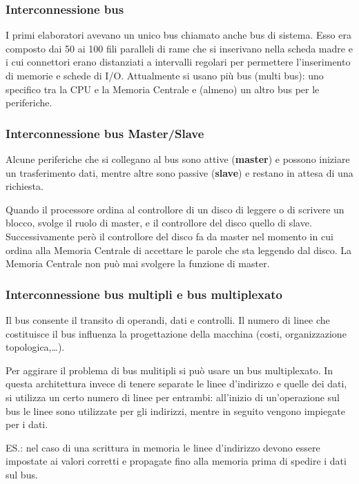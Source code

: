 \documentclass[12pt]{article} %
\begin{document}
\subsubsection{Interconnessione bus}
I primi elaboratori avevano un unico bus chiamato anche bus di sistema. Esso era composto dai 50 ai 100 fili paralleli di rame che si inserivano nella scheda madre e i cui connettori erano distanziati a intervalli regolari per permettere l’inserimento di memorie e schede
di I/O. Attualmente si usano più bus (multi bus): uno specifico tra la CPU e la Memoria Centrale e (almeno) un altro bus per le periferiche.\par\medskip\noindent 
\subsubsection{Interconnessione bus Master/Slave}
Alcune periferiche che si collegano al bus sono attive (\textbf{master}) e possono iniziare un trasferimento dati, mentre altre sono passive (\textbf{slave}) e restano in attesa di una richiesta. \par\medskip\noindent
Quando il processore ordina al controllore di un disco di leggere o di scrivere un blocco, svolge il ruolo di master, e il controllore del disco quello di slave. Successivamente però il controllore
del disco fa da master nel momento in cui ordina alla Memoria Centrale di accettare le parole che sta leggendo dal disco. La Memoria Centrale non può mai svolgere la funzione di master.\par\medskip\noindent
\subsubsection{Interconnessione bus multipli e bus multiplexato}
Il bus consente il transito di operandi, dati e controlli. Il numero di linee che costituisce il bus influenza la progettazione della macchina (costi, organizzazione topologica,…). \par\medskip\noindent
Per aggirare il problema di bus mulitipli si può usare un bus multiplexato. In questa architettura invece di tenere separate le linee d’indirizzo e quelle dei dati, si utilizza un certo numero di linee per entrambi: all’inizio di un’operazione sul bus le linee sono utilizzate per gli indirizzi, mentre in seguito vengono impiegate per i dati.\par\medskip\noindent
ES.: nel caso di una scrittura in memoria le linee d’indirizzo devono essere impostate ai valori corretti e propagate fino alla memoria prima di spedire i dati sul bus.
\end{document}
